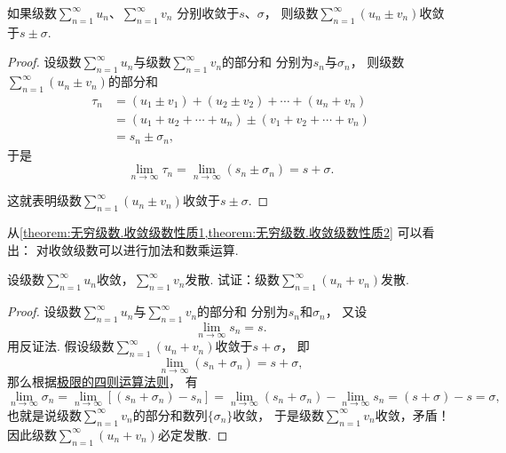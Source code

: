 \begin{property}\label{theorem:无穷级数.收敛级数性质2}
如果级数\(\sum_{n=1}^\infty u_n\)、\(\sum_{n=1}^\infty v_n\)
分别收敛于\(s\)、\(\sigma\)，
则级数\(\sum_{n=1}^\infty(u_n \pm v_n)\)收敛于\(s \pm \sigma\).
\begin{proof}
设级数\(\sum_{n=1}^\infty u_n\)与级数\(\sum_{n=1}^\infty v_n\)的部分和
分别为\(s_n\)与\(\sigma_n\)，
则级数\(\sum_{n=1}^\infty(u_n \pm v_n)\)的部分和\begin{align*}
	\tau_n &= (u_1 \pm v_1) + (u_2 \pm v_2) + \dotsb + (u_n + v_n) \\
	&= (u_1 + u_2 + \dotsb + u_n) \pm (v_1 + v_2 + \dotsb + v_n) \\
	&= s_n \pm \sigma_n,
\end{align*}
于是\begin{equation*}
	\lim_{n\to\infty} \tau_n
	= \lim_{n\to\infty} (s_n \pm \sigma_n)
	= s + \sigma.
\end{equation*}

这就表明级数\(\sum_{n=1}^\infty(u_n \pm v_n)\)收敛于\(s \pm \sigma\).
\end{proof}
\end{property}
\begin{remark}
从\cref{theorem:无穷级数.收敛级数性质1,theorem:无穷级数.收敛级数性质2} 可以看出：
对收敛级数可以进行加法和数乘运算.
\end{remark}

\begin{example}
设级数\(\sum_{n=1}^\infty u_n\)收敛，\(\sum_{n=1}^\infty v_n\)发散.
试证：级数\(\sum_{n=1}^\infty (u_n + v_n)\)发散.
\begin{proof}
设级数\(\sum_{n=1}^\infty u_n\)与\(\sum_{n=1}^\infty v_n\)的部分和
分别为\(s_n\)和\(\sigma_n\)，
又设\begin{equation*}
	\lim_{n\to\infty} s_n = s.
\end{equation*}
用反证法.
假设级数\(\sum_{n=1}^\infty (u_n + v_n)\)收敛于\(s + \sigma\)，
即\begin{equation*}
	\lim_{n\to\infty} (s_n + \sigma_n) = s+\sigma,
\end{equation*}
那么根据\hyperref[theorem:极限.极限的四则运算法则]{极限的四则运算法则}，
有\begin{equation*}
	\lim_{n\to\infty} \sigma_n
	= \lim_{n\to\infty} [(s_n + \sigma_n) - s_n]
	= \lim_{n\to\infty} (s_n + \sigma_n) - \lim_{n\to\infty} s_n
	= (s + \sigma) - s
	= \sigma,
\end{equation*}
也就是说级数\(\sum_{n=1}^\infty v_n\)的部分和数列\(\{\sigma_n\}\)收敛，
于是级数\(\sum_{n=1}^\infty v_n\)收敛，矛盾！
因此级数\(\sum_{n=1}^\infty (u_n + v_n)\)必定发散.
\end{proof}
\end{example}

